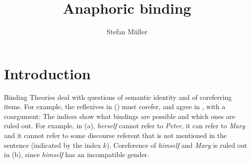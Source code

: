\documentclass[output=paper
 	        ,biblatex
                ,babelshorthands
                ,newtxmath
                ,draftmode
                ,colorlinks, citecolor=brown
]{langscibook}
\title{Anaphoric binding}
\author{%
Stefan Müller\affiliation{Humboldt-Universität zu Berlin}
}
\begin{document}
\maketitle
\label{chap-binding}

\section{Introduction} 





Binding Theories deal with questions of semantic identity and  of coreferring
items. For example, the reflexives in () must corefer, and agree in , with a
coargument:
\eal
\label{ex-binding-reflexives}
\zl
The indices show what bindings are possible and which ones are ruled out. For example, in
(a), \emph{herself} cannot refer to \emph{Peter}, it can refer to \emph{Mary} and it cannot
refer to some discourse referent that is not mentioned in the sentence (indicated by the index
$k$). Coreference of \emph{himself} and \emph{Mary} is ruled out in (b), since \emph{himself}
has an incompatible gender.
\end{document}
